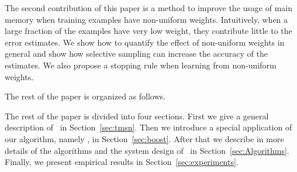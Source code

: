 The second contribution of this paper is a method to improve the usage
of main memory when training examples have non-uniform
weights. Intuitively, when a large fraction of the examples have very
low weight, they contribute little to the error estimates. We show how
to quantify the effect of non-uniform weights in general and show how
selective sampling can increase the accuracy of the estimates. We also
propose a stopping rule when learning from non-uniform weights.

The rest of the paper is organized as follows.

The rest of the paper is divided into four sections.
First we give a general description of \tmsn\ in Section~\ref{sec:tmsn}.
Then we introduce a special application of our algorithm, namely \Sparrow, in Section~\ref{sec:boost}.
After that we describe in more details of the algorithms and the system design of \Sparrow\ in
Section~\ref{sec:Algorithms}.
Finally, we present empirical results in Section~\ref{sec:experiments}.

\fi
